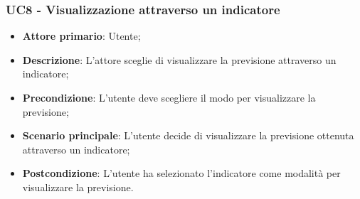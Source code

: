 \subsubsection{UC8 - Visualizzazione attraverso un indicatore}
\label{sssec:uc8}
\begin{itemize}
  \item \textbf{Attore primario}: Utente;
  \item \textbf{Descrizione}: L'attore sceglie di visualizzare la previsione attraverso un indicatore;
  \item \textbf{Precondizione}: L'utente deve scegliere il modo per visualizzare la previsione;
  \item \textbf{Scenario principale}: L'utente decide di visualizzare la previsione ottenuta attraverso un indicatore;
  \item \textbf{Postcondizione}: L'utente ha selezionato l'indicatore come modalità per visualizzare la previsione.
\end{itemize}
